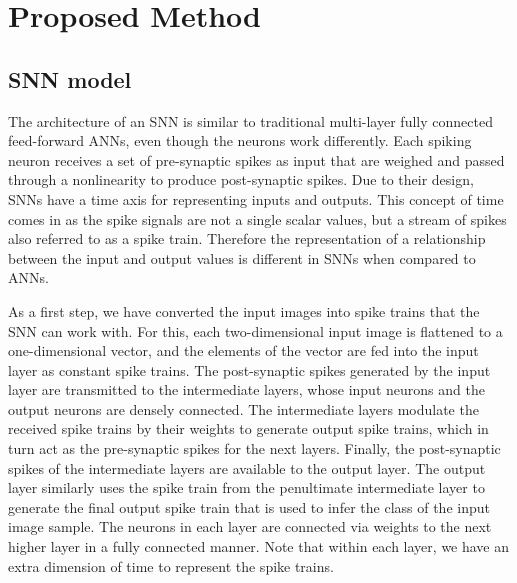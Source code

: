 \documentclass{article}
\begin{document}
\section{Proposed Method}
\label{sec:proposedMethod}

\subsection{SNN model}
The architecture of an SNN is similar to traditional multi-layer fully connected feed-forward ANNs, even though the neurons work differently. Each spiking neuron receives a set of pre-synaptic spikes as input that are weighed and passed through a nonlinearity to produce post-synaptic spikes. Due to their design, SNNs have a time axis for representing inputs and outputs. This concept of time comes in as the spike signals are not a single scalar values, but a stream of spikes also referred to as a spike train. Therefore the representation of a relationship between the input and output values is different in SNNs when compared to ANNs.

As a first step, we have converted the input images into spike trains that the SNN can work with. For this, each two-dimensional input image is flattened to a one-dimensional vector, and the elements of the vector are fed into the input layer as constant spike trains. The post-synaptic spikes generated by the input layer are transmitted to the intermediate layers, whose input neurons and the output neurons are densely connected. The intermediate layers modulate the received spike trains by their weights to generate output spike trains, which in turn act as the pre-synaptic spikes for the next layers. Finally, the post-synaptic spikes of the intermediate layers are available to the output layer. The output layer similarly uses the spike train from the penultimate intermediate layer to generate the final output spike train that is used to infer the class of the input image sample. The neurons in each layer are connected via weights to the next higher layer in a fully connected manner. Note that within each layer, we have an extra dimension of time to represent the spike trains.
\end{document}
